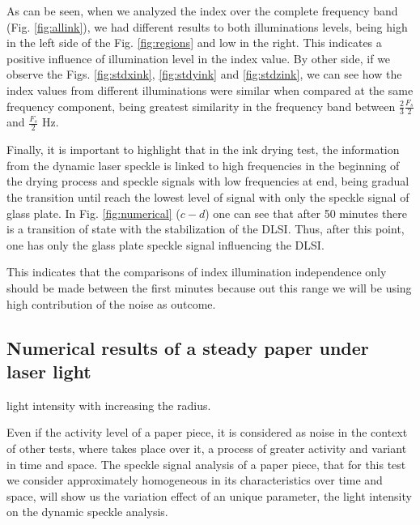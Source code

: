 \documentclass[review]{elsarticle}
\begin{document}
As can be seen, when we analyzed the index over the complete frequency band (Fig. \ref{fig:allink}),
we had different results to both illuminations levels, being high in the left 
side of the Fig. \ref{fig:regions} and low in the right. This 
indicates a positive influence of illumination level in the index value.
By other side, if we observe the Figs. \ref{fig:stdxink}, \ref{fig:stdyink} and \ref{fig:stdzink},
we can see how the index values from different illuminations were similar when compared at the same frequency component,
being greatest similarity in the frequency band between $\frac{2}{3}\frac{F_s}{2}$ and $\frac{F_s}{2}$ Hz.

Finally, it is important to highlight that in the ink drying test, the information 
from the dynamic laser speckle is linked to high frequencies in the beginning of 
the drying process and  speckle signals with low frequencies at end, being gradual the transition
until reach the lowest level of signal with only the speckle signal of glass plate.
In Fig. \ref{fig:numerical} ($c-d$) one can see that after 50 minutes there is a 
transition of state with the stabilization of the DLSI. Thus, after this point, 
one has only the glass plate speckle signal influencing the DLSI.

This indicates that the comparisons of index illumination independence
only should be made between the first minutes because out this range we will be using high contribution of 
the noise as outcome.

\subsection{Numerical results of a steady paper under laser light} 
\label{subsec:numericalpaper}

light intensity with increasing the radius.

Even if the activity level of a paper piece, 
it  is considered as noise in the context of other tests, where takes place over it, 
a process of greater activity and variant in time and space. 
The speckle signal analysis of a paper piece, 
that for this test we consider approximately homogeneous in its characteristics over time and space,
will show us  the variation effect of an unique parameter, the light intensity on the dynamic speckle analysis.
\end{document}
